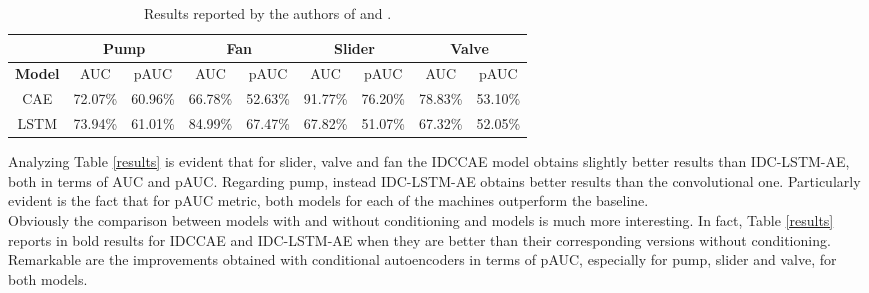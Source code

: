\begin{table}[ht]
\small
\centering
\begin{tabular}{|c|c|c|c|c|c|c|c|c|} 
\cline{2-9}
\multicolumn{1}{c|}{} & \multicolumn{2}{c|}{\textbf{Pump}} & \multicolumn{2}{c|}{\textbf{Fan}} & \multicolumn{2}{c|}{\textbf{Slider}} & \multicolumn{2}{c|}{\textbf{Valve}} \\ 
\hline
\textbf{Model} & AUC & pAUC & AUC & pAUC & AUC & pAUC & AUC & pAUC \\ 
\hline
CAE \cite{15DeepDenseConvAE} & 72.07\% & 60.96\% & 66.78\% & 52.63\% & 91.77\% & 76.20\% & 78.83\% & 53.10\% \\ 
\hline
LSTM \cite{16LSTMDeepAutoencodersForASDtask} & 73.94\% & 61.01\% & 84.99\% & 67.47\% & 67.82\% & 51.07\% & 67.32\% & 52.05\% \\
\hline
\end{tabular}
\caption{Results reported by the authors of \cite{15DeepDenseConvAE} and \cite{16LSTMDeepAutoencodersForASDtask}.}
\label{results_papers_comparison}
\end{table}

Analyzing Table \ref{results} is evident that for slider, valve and fan the IDCCAE model obtains slightly better results than IDC-LSTM-AE, both in terms of AUC and pAUC. Regarding pump, instead IDC-LSTM-AE obtains better results than the convolutional one. Particularly evident is the fact that for pAUC metric, both models for each of the machines outperform the baseline.\\ Obviously the comparison between models with and without conditioning and models is much more interesting. In fact, Table \ref{results} reports in bold results for IDCCAE and IDC-LSTM-AE when they are better than their corresponding versions without conditioning. Remarkable are the improvements obtained with conditional autoencoders in terms of pAUC, especially for pump, slider and valve, for both models.


